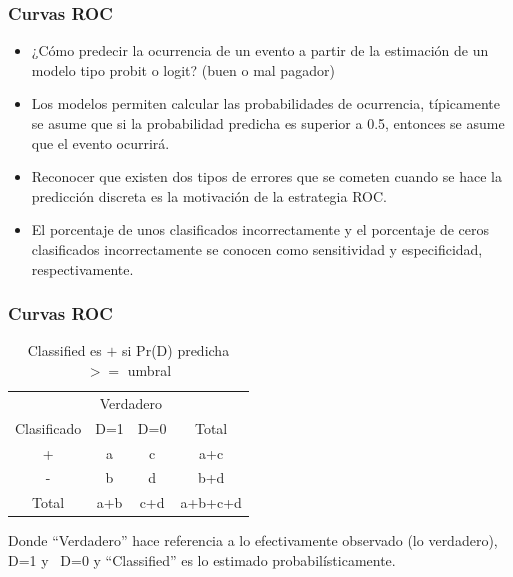 \begin{frame}[fragile]
	\frametitle{Curvas ROC}
	\begin{itemize}
		\item  ¿Cómo predecir la ocurrencia de un evento a partir de la estimación de un modelo tipo probit
		o logit? (buen o mal pagador)
		\item Los modelos permiten calcular las probabilidades de
		ocurrencia, típicamente se asume que si la probabilidad predicha
		es superior a 0.5, entonces se asume que el evento ocurrirá.
		\item Reconocer que existen dos tipos de errores que se cometen cuando se
		hace la predicción discreta es la motivación de la estrategia
		ROC.
		\item El porcentaje de unos clasificados incorrectamente y el porcentaje de ceros clasificados
		incorrectamente se conocen como sensitividad y especificidad,
		respectivamente.
	\end{itemize}
\end{frame}

\begin{frame}[fragile]
	\frametitle{Curvas ROC}
	\begin{table}
		\centering
		\begin{tabular}{cccc}
			\hline \hline
			& \multicolumn{ 2}{c}{Verdadero} &            \\
			
			Clasificado &          D=1 &         D=0 &      Total \\
			\hline
			+ &          a &          c &        a+c \\
			
			- &          b &          d &        b+d \\
			\hline
			Total &        a+b &        c+d &    a+b+c+d \\
			\hline
		\end{tabular}
		\caption{Classified es $+$ si Pr(D) predicha $>=$ umbral}
	\end{table}
	
	Donde ``Verdadero'' hace referencia a lo efectivamente observado
	(lo verdadero), D=1 y ~D=0 y ``Classified'' es lo estimado
	probabilísticamente.
\end{frame}

